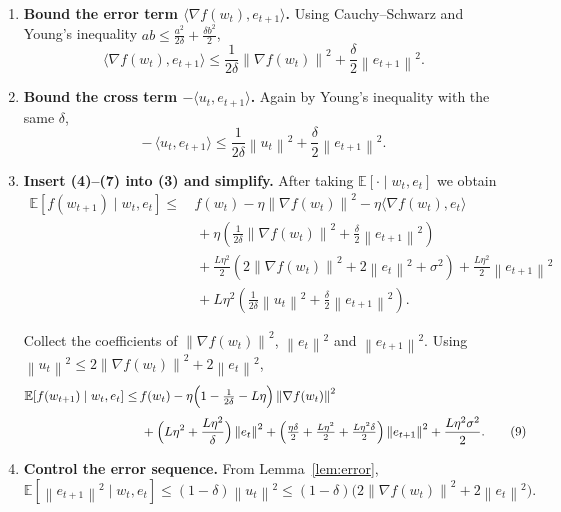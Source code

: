 \documentclass{article}
\newcommand{\E}{\mathbb{E}}
\newcommand{\norm}[1]{\left\|#1\right\|}
\begin{document}
\begin{enumerate}
\item[Step 5.] \textbf{Bound the error term $\langle\nabla f(w_{t}),e_{t+1}\rangle$.}
Using Cauchy–Schwarz and Young’s inequality $ab\le \frac{a^{2}}{2\delta}+\frac{\delta b^{2}}{2}$,
\[
\langle\nabla f(w_{t}),e_{t+1}\rangle
\le \frac{1}{2\delta}\norm{\nabla f(w_{t})}^{2}
     +\frac{\delta}{2}\norm{e_{t+1}}^{2}. \tag{6}
\]

\item[Step 6.] \textbf{Bound the cross term $-\langle u_{t},e_{t+1}\rangle$.}
Again by Young’s inequality with the same $\delta$,
\[
-\,\langle u_{t},e_{t+1}\rangle
\le \frac{1}{2\delta}\norm{u_{t}}^{2}
   +\frac{\delta}{2}\norm{e_{t+1}}^{2}. \tag{7}
\]

\item[Step 7.] \textbf{Insert (4)–(7) into (3) and simplify.}
After taking $\E[\cdot\mid w_{t},e_{t}]$ we obtain
\[
\begin{aligned}
\E\!\left[f(w_{t+1})\mid w_{t},e_{t}\right]
\le &\, f(w_{t})
      -\eta\norm{\nabla f(w_{t})}^{2}
      -\eta\langle\nabla f(w_{t}),e_{t}\rangle   \\[1mm]
   &\;+\eta\!\left(\frac{1}{2\delta}\norm{\nabla f(w_{t})}^{2}
                +\frac{\delta}{2}\norm{e_{t+1}}^{2}\right) \\[1mm]
   &\;+\frac{L\eta^{2}}{2}\!\left(2\norm{\nabla f(w_{t})}^{2}
                +2\norm{e_{t}}^{2}+\sigma^{2}\right)
      +\frac{L\eta^{2}}{2}\norm{e_{t+1}}^{2}    \\[1mm]
   &\;+L\eta^{2}\!\left(\frac{1}{2\delta}\norm{u_{t}}^{2}
                    +\frac{\delta}{2}\norm{e_{t+1}}^{2}\right). \tag{8}
\end{aligned}
\]

Collect the coefficients of $\norm{\nabla f(w_{t})}^{2}$,
$\norm{e_{t}}^{2}$ and $\norm{e_{t+1}}^{2}$.
Using $\norm{u_{t}}^{2}\le 2\norm{\nabla f(w_{t})}^{2}+2\norm{e_{t}}^{2}$,
\[
\begin{aligned}
\E\!\left[f(w_{t+1})\mid w_{t},e_{t}\right]
\le &\, f(w_{t})
      -\eta\Bigl(1-\tfrac{1}{2\delta}-L\eta\Bigr)\norm{\nabla f(w_{t})}^{2}   \\[1mm]
   &\;+\Bigl(L\eta^{2}+ \frac{L\eta^{2}}{\delta}\Bigr)\norm{e_{t}}^{2}
      +\Bigl(\tfrac{\eta\delta}{2}+ \tfrac{L\eta^{2}}{2}
            +\tfrac{L\eta^{2}\delta}{2}\Bigr)\norm{e_{t+1}}^{2}
      +\frac{L\eta^{2}\sigma^{2}}{2}. \tag{9}
\end{aligned}
\]

\item[Step 8.] \textbf{Control the error sequence.}
From Lemma~\ref{lem:error},
\[
\E\!\left[\norm{e_{t+1}}^{2}\mid w_{t},e_{t}\right]\le (1-\delta)\norm{u_{t}}^{2}
\le (1-\delta)\bigl(2\norm{\nabla f(w_{t})}^{2}+2\norm{e_{t}}^{2}\bigr). \tag{10}
\]


\end{enumerate}
\end{document}
